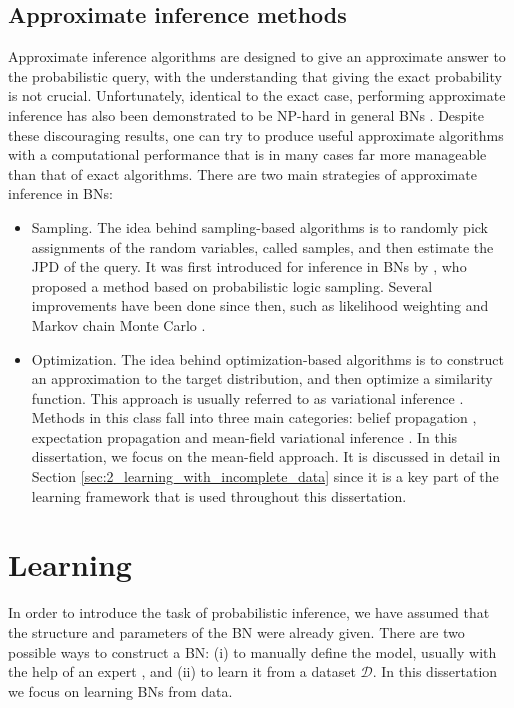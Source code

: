 \subsection{Approximate inference methods} \label{sec:2_approximate_inference}
Approximate inference algorithms are designed to give an approximate answer to the probabilistic query, with the understanding that giving the exact probability is not crucial. Unfortunately, identical to the exact case, performing approximate inference has also been demonstrated to be NP-hard in general BNs \citep{dagum1993, lerner2001}. Despite these discouraging results, one can try to produce useful approximate algorithms with a computational performance that is in many cases far more manageable than that of exact algorithms. There are two main strategies of approximate inference in BNs:

\begin{itemize}
	\item Sampling. The idea behind sampling-based algorithms is to randomly pick assignments of the random variables, called samples, and then estimate the JPD of the query. It was first introduced for inference in BNs by \cite{henrion1986}, who proposed a method based on probabilistic logic sampling. Several improvements have been done since then, such as likelihood weighting \citep{shachter1989_sim} and Markov chain Monte Carlo \citep{pearl1987,hrycej1990,york1992}.
	\item Optimization. The idea behind optimization-based algorithms is to construct an approximation to the target distribution, and then optimize a similarity function. This approach is usually referred to as variational inference \citep{blei2016}. Methods in this class fall into three main categories: belief propagation \citep{pearl1988, yedidia2000}, expectation propagation \citep{minka2001} and mean-field variational inference \citep{saul1996}. In this dissertation, we focus on the mean-field approach. It is discussed in detail in Section \ref{sec:2_learning_with_incomplete_data} since it is a key part of the learning framework that is used throughout this dissertation. 
\end{itemize}

\section{Learning} \label{sec:2_learning}
In order to introduce the task of probabilistic inference, we have assumed that the structure and parameters of the BN were already given. There are two possible ways to construct a BN: (i) to manually define the model, usually with the help of an expert \citep{beinlich1992,vandergaag2002}, and (ii) to learn it from a dataset $\mathcal{D}$. In this dissertation we focus on learning BNs from data.


